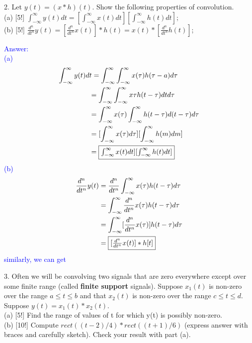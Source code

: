 \documentclass[12pt,a4paper]{article}
\begin{document}
\begin{tcolorbox}[colback = white]
2. Let $y(t)=(x*h)(t)$. Show the following properties of convolution.\\
(a) [5!] $\int_{-\infty}^{\infty} y(t) d t=\left[\int_{-\infty}^{\infty} x(t) d t\right]\left[\int_{-\infty}^{\infty} h(t) d t\right]$;\\
(b) [5!] $\frac{d^n}{d t^n} y(t)=\left[\frac{d^n}{d t^n} x(t)\right] * h(t)=x(t) *\left[\frac{d^n}{d t^n} h(t)\right]$;
\end{tcolorbox}

\begin{tcolorbox}
\normalsize
\textcolor{blue}{Answer:\\
(a)$$
\begin{aligned}
    \int_{-\infty}^\infty y(t)d&t=\int_{-\infty}^\infty \int_{-\infty}^\infty x(\tau) h(\tau-a) d\tau\\
    &=\int_{-\infty}^\infty \int_{-\infty}^\infty x\tau h(t-\tau) dt d\tau\\
    &=\int_{-\infty}^\infty  x(\tau) \int_{-\infty}^\infty h(t-\tau) d(t-\tau) d\tau\\
    &=[\int_{-\infty}^\infty x(\tau) d\tau][\int_{-\infty}^\infty h(m) dm]\\
    &=\fbox{$\int_{-\infty}^\infty x(t) dt][\int_{-\infty}^\infty h(t) dt]$}
\end{aligned}
$$
(b)$$
\begin{aligned}
    \frac{d^n}{dt^n}y(t)&=\frac{d^n}{dt^n} \int_{-\infty}^\infty x(\tau) h(t-\tau) d\tau\\
    &=\int_{-\infty}^\infty \frac{d^n}{dt^n} x(\tau) h(t-\tau) d\tau\\
    &=\int_{-\infty}^\infty [\frac{d^n}{dt^n} x(\tau)] h(t-\tau) d\tau\\
    &=\fbox{$[\frac{d^n}{dt^n} x(t)]*h[t]$}
\end{aligned}
$$
similarly, we can get \fbox{$\frac{d^n}{dt^n}y(t)=x(t)\frac{d^n}{dt^n} h(t)]$}
}
\end{tcolorbox}

\begin{tcolorbox}[colback = white]
3. Often we will be convolving two signals that are zero everywhere except over some finite range (called \textbf{finite support} signals). Suppose $x_{1}(t)$ is non-zero over the range $a\leq t\leq b$ and that $x_{2}(t)$ is non-zero over the range $c\leq t\leq d$. Suppose $y(t) = x_{1}(t) * x_{2}(t)$.\\
(a) [5!] Find the range of values of t for which y(t) is possibly non-zero.\\
(b) [10!] Compute $rect((t-2)/4)*rect((t+1)/6)$ (express answer with braces and carefully sketch). Check your result with part (a).
\end{tcolorbox}
\end{document}
